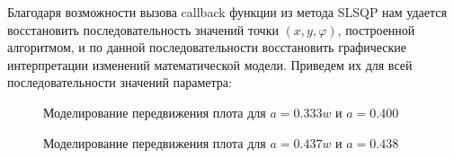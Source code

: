 \documentclass[12pt,a4paper]{article}
\begin{document}
		Благодаря возможности вызова callback функции из метода SLSQP нам удается восстановить последовательность значений точки $(x,y,\varphi)$, построенной алгоритмом, и по данной последовательности восстановить графические интерпретации изменений математической модели. Приведем их для всей последовательности значений параметра:
		\begin{figure}[H]
			\centering
			\caption{Моделирование передвижения плота для $a = 0.333w$ и $a = 0.400$}
		\end{figure}
		\begin{figure}[H]
			\centering
			\caption{Моделирование передвижения плота для $a = 0.437w$ и $a = 0.438$}
		\end{figure}
\end{document}
